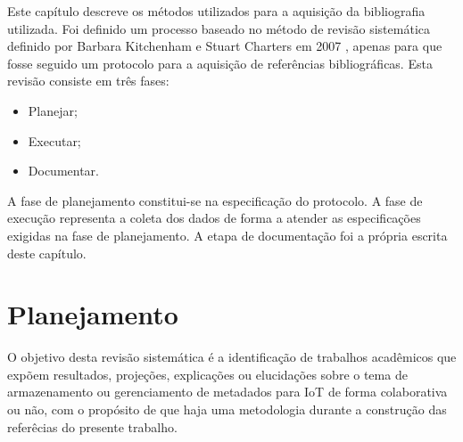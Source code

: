 \newcommand{\texCommand}[1]{\texttt{\textbackslash{#1}}}%

\newcommand{\exemplo}[1]{%
\vspace{\baselineskip}%
\noindent\fbox{\begin{minipage}{\textwidth}#1\end{minipage}}%
\\\vspace{\baselineskip}}%

\newcommand{\exemploVerbatim}[1]{%
\vspace{\baselineskip}%
\noindent\fbox{\begin{minipage}{\textwidth}%
#1\end{minipage}}%
\\\vspace{\baselineskip}}%


\quad Este capítulo descreve os métodos utilizados para a aquisição da bibliografia utilizada. Foi definido um processo baseado no método de revisão sistemática definido por Barbara Kitchenham e Stuart Charters em 2007 \cite{rsguidelines}, apenas para que fosse seguido um protocolo para a aquisição de referências bibliográficas. Esta revisão consiste em três fases:
\begin{itemize}
  \item Planejar;
  \item Executar;
  \item Documentar.
\end{itemize}
\quad A fase de planejamento constitui-se na especificação do protocolo.
A fase de execução representa a coleta dos dados de forma a atender as especificações
exigidas na fase de planejamento. A etapa de documentação foi a própria escrita deste capítulo.

\section{Planejamento}
\quad O objetivo desta revisão sistemática é a identificação de trabalhos acadêmicos
que expõem resultados, projeções, explicações ou elucidações sobre o tema de armazenamento ou gerenciamento
de metadados para \acrlong{IoT} de forma colaborativa ou não, com o propósito de que haja uma metodologia durante a construção das referêcias do presente trabalho.

